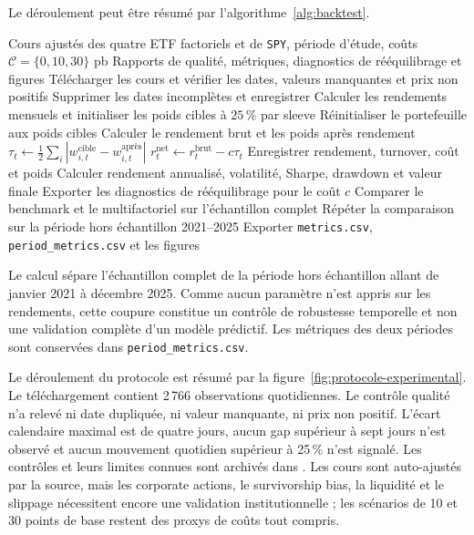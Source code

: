 Le déroulement peut être résumé par l'algorithme~\ref{alg:backtest}.

\begin{algorithm}[H]
\caption{Calcul du portefeuille multifactoriel et des métriques}
\label{alg:backtest}
\small
\begin{algorithmic}[1]
\Require Cours ajustés des quatre ETF factoriels et de \texttt{SPY}, période d'étude, coûts $\mathcal{C}=\{0,10,30\}$ pb
\Ensure Rapports de qualité, métriques, diagnostics de rééquilibrage et figures
\State Télécharger les cours et vérifier les dates, valeurs manquantes et prix non positifs
\State Supprimer les dates incomplètes et enregistrer 
\State Calculer les rendements mensuels et initialiser les poids cibles à $25\,\%$ par sleeve
    \State Réinitialiser le portefeuille aux poids cibles
        \State Calculer le rendement brut et les poids après rendement
        \State $\tau_t \gets \frac{1}{2}\sum_i \left|w^{\mathrm{cible}}_{i,t}-w^{\mathrm{après}}_{i,t}\right|$
        \State $r^{\mathrm{net}}_t \gets r^{\mathrm{brut}}_t-c\tau_t$
        \State Enregistrer rendement, turnover, coût et poids
    \EndFor
    \State Calculer rendement annualisé, volatilité, Sharpe, drawdown et valeur finale
    \State Exporter les diagnostics de rééquilibrage pour le coût $c$
\EndFor
\State Comparer le benchmark et le multifactoriel sur l'échantillon complet
\State Répéter la comparaison sur la période hors échantillon 2021--2025
\State Exporter \texttt{metrics.csv}, \texttt{period\_metrics.csv} et les figures
\end{algorithmic}
\end{algorithm}

Le calcul sépare l'échantillon complet de la période hors échantillon allant de janvier 2021 à décembre 2025. Comme aucun paramètre n'est appris sur les rendements, cette coupure constitue un contrôle de robustesse temporelle et non une validation complète d'un modèle prédictif. Les métriques des deux périodes sont conservées dans \texttt{period\_metrics.csv}.

Le déroulement du protocole est résumé par la figure~\ref{fig:protocole-experimental}. Le téléchargement contient 2\,766 observations quotidiennes. Le contrôle qualité n'a relevé ni date dupliquée, ni valeur manquante, ni prix non positif. L'écart calendaire maximal est de quatre jours, aucun gap supérieur à sept jours n'est observé et aucun mouvement quotidien supérieur à 25\,\% n'est signalé. Les contrôles et leurs limites connues sont archivés dans . Les cours sont auto-ajustés par la source, mais les corporate actions, le survivorship bias, la liquidité et le slippage nécessitent encore une validation institutionnelle ; les scénarios de 10 et 30 points de base restent des proxys de coûts tout compris.

